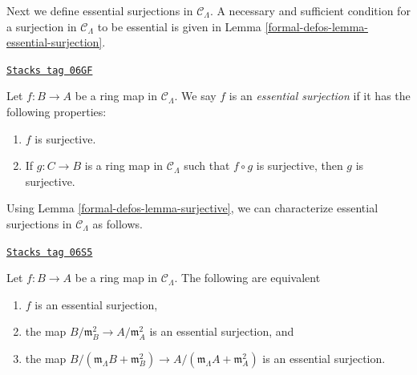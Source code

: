 Next we define essential surjections in $\mathcal{C}_\Lambda$. A necessary
and sufficient condition for a surjection in $\mathcal{C}_\Lambda$ to be
essential is given in Lemma \ref{formal-defos-lemma-essential-surjection}.

\begin{definition}
\label{formal-defos-definition-essential-surjection}
\href{https://stacks.math.columbia.edu/tag/06GF}{\texttt{Stacks tag 06GF}}

Let $f: B \to A$ be a ring map in $\mathcal{C}_\Lambda$.  We say $f$
is an {\it essential surjection} if it has the following properties:
\begin{enumerate}
\item $f$ is surjective.
\item If $g: C \to B$ is a ring map in $\mathcal{C}_\Lambda$ such that
$f \circ g$ is surjective, then $g$ is surjective.
\end{enumerate}
\end{definition}

Using Lemma \ref{formal-defos-lemma-surjective}, we can characterize
essential surjections in $\mathcal{C}_\Lambda$ as follows.

\begin{lemma}
\label{formal-defos-lemma-essential-surjection-mod-squares}
\href{https://stacks.math.columbia.edu/tag/06S5}{\texttt{Stacks tag 06S5}}

Let $f: B \to A$ be a ring map in $\mathcal{C}_\Lambda$.
The following are equivalent
\begin{enumerate}
\item $f$ is an essential surjection,
\item the map $B/\mathfrak m_B^2 \to A/\mathfrak m_A^2$ is an essential
surjection, and
\item the map
$B/(\mathfrak m_\Lambda B + \mathfrak m_B^2) \to
A/(\mathfrak m_\Lambda A + \mathfrak m_A^2)$ is an essential surjection.
\end{enumerate}
\end{lemma}

